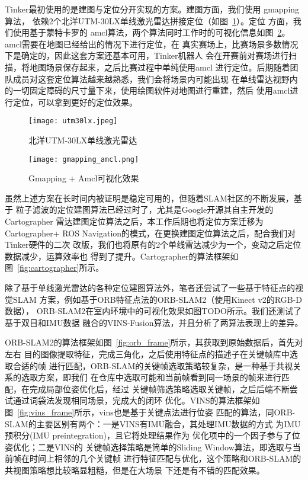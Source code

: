 Tinker最初使用的是建图与定位分开实现的方案。建图方面，我们使用
gmapping算法\cite{grisettiyz2005improving}，
依赖2个北洋UTM-30LX单线激光雷达拼接定位（如图~\ref{fig:utm30lx}）。定位
方面，我们使用基于蒙特卡罗的
amcl算法\cite{fox2002kld}，两个算法同时工作时的可视化信息如图~\ref{fig:gmapping_amcl}。
amcl需要在地图已经给出的情况下进行定位，在
真实赛场上，比赛场景多数情况下是确定的，因此这套方案还基本可用，Tinker机器人
会在开赛前对赛场进行扫描，将地图场景保存起来，之后比赛过程中单纯使用amcl
进行定位。后期随着团队成员对这套定位算法越来越熟悉，我们会将场景内可能出现
在单线雷达视野内的一切固定障碍的尺寸量下来，使用绘图软件对地图进行重建，然后
使用amcl进行定位，可以拿到更好的定位效果。

\begin{figure}
  \centering
  \texttt{[image: utm30lx.jpeg]}
  \caption{北洋UTM-30LX单线激光雷达}
  \label{fig:utm30lx}
\end{figure}


\begin{figure}
  \centering
  \texttt{[image: gmapping\_amcl.png]}
  \caption{Gmapping + Amcl可视化效果}
  \label{fig:gmapping_amcl}
\end{figure}

虽然上述方案在长时间内被证明是稳定可用的，但随着SLAM社区的不断发展，基于
粒子滤波的定位建图算法已经过时了，尤其是Google开源其自主开发的Cartographer
雷达建图定位算法\cite{hess2016real}之后，本工作后期也将定位方案迁移为Cartographer+
ROS Navigation的模式，在更换建图定位算法之后，配合我们对Tinker硬件的二次
改版，我们也将原有的2个单线雷达减少为一个，变动之后定位数据减少，运算效率也
得到了提升。Cartographer的算法框架如图~\ref{fig:cartographer}所示。


除了基于单线激光雷达的各种定位建图算法外，笔者还尝试了一些基于特征点的视觉SLAM
方案，例如基于ORB特征点法的ORB-SLAM2（使用Kinect v2的RGB-D数据）\cite{mur2015orb}，
ORB-SLAM2在室内环境中的可视化效果如图TODO所示。我们还测试了基于双目和IMU数据
融合的VINS-Fusion\cite{qin2018vins}算法，并且分析了两算法表现上的差异。

ORB-SLAM2的算法框架如图~\ref{fig:orb_frame}所示，其获取到原始数据后，首先对左右
目的图像提取特征，完成三角化，之后使用特征点的描述子在关键帧库中选取合适的帧
进行匹配，ORB-SLAM的关键帧选取策略较复杂，是一种基于共视关系的选取方案，即我们
在仓库中选取可能和当前帧看到同一场景的帧来进行匹配，在完成局部位姿优化后，经过
关键帧筛选策略选取关键帧，之后后端不断尝试通过词袋法发现相同场景，完成大的闭环
优化。VINS的算法框架如图~\ref{fig:vins_frame}所示，vins也是基于关键点法进行位姿
匹配的算法，同ORB-SLAM的主要区别有两个：一是VINS有IMU融合，其处理IMU数据的方式
为IMU预积分(IMU preintegration)\cite{forster2015manifold}，且它将处理结果作为
优化项中的一个因子参与了位姿优化；二是VINS的
关键帧选择策略是简单的Sliding Window算法，即选取与当前帧在时间上相邻的几个关键帧
进行特征匹配与优化，这个策略和ORB-SLAM的共视图策略想比较略显粗糙，但是在大场景
下还是有不错的匹配效果。




